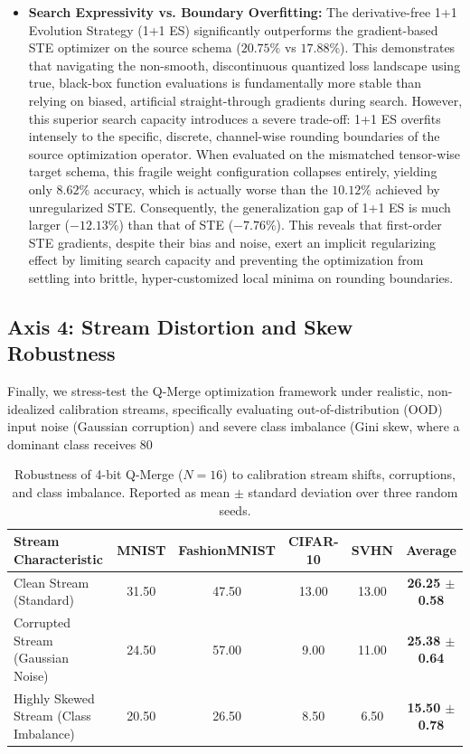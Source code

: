\begin{itemize}
    \item \textbf{Search Expressivity vs. Boundary Overfitting:} The derivative-free 1+1 Evolution Strategy (1+1 ES) significantly outperforms the gradient-based STE optimizer on the source schema ($20.75\%$ vs $17.88\%$). This demonstrates that navigating the non-smooth, discontinuous quantized loss landscape using true, black-box function evaluations is fundamentally more stable than relying on biased, artificial straight-through gradients during search. However, this superior search capacity introduces a severe trade-off: 1+1 ES overfits intensely to the specific, discrete, channel-wise rounding boundaries of the source optimization operator. When evaluated on the mismatched tensor-wise target schema, this fragile weight configuration collapses entirely, yielding only $8.62\%$ accuracy, which is actually worse than the $10.12\%$ achieved by unregularized STE. Consequently, the generalization gap of 1+1 ES is much larger ($-12.13\%$) than that of STE ($-7.76\%$). This reveals that first-order STE gradients, despite their bias and noise, exert an implicit regularizing effect by limiting search capacity and preventing the optimization from settling into brittle, hyper-customized local minima on rounding boundaries.
\end{itemize}

\subsection{Axis 4: Stream Distortion and Skew Robustness}
Finally, we stress-test the Q-Merge optimization framework under realistic, non-idealized calibration streams, specifically evaluating out-of-distribution (OOD) input noise (Gaussian corruption) and severe class imbalance (Gini skew, where a dominant class receives 80%
\begin{table}[t]
\caption{Robustness of 4-bit Q-Merge ($N=16$) to calibration stream shifts, corruptions, and class imbalance. Reported as mean $\pm$ standard deviation over three random seeds.}
\label{tab:axis4_skew}
\vskip 0.15in
\begin{center}
\begin{small}
\begin{sc}
\begin{tabular}{lccccc}
\toprule
Stream Characteristic & MNIST & FashionMNIST & CIFAR-10 & SVHN & \textbf{Average} \\
\midrule
Clean Stream (Standard) & 31.50 & 47.50 & 13.00 & 13.00 & \textbf{26.25 $\pm$ 0.58} \\
Corrupted Stream (Gaussian Noise) & 24.50 & 57.00 & 9.00 & 11.00 & \textbf{25.38 $\pm$ 0.64} \\
Highly Skewed Stream (Class Imbalance) & 20.50 & 26.50 & 8.50 & 6.50 & \textbf{15.50 $\pm$ 0.78} \\
\bottomrule
\end{tabular}
\end{sc}
\end{small}
\end{center}
\vskip -0.1in
\end{table}

